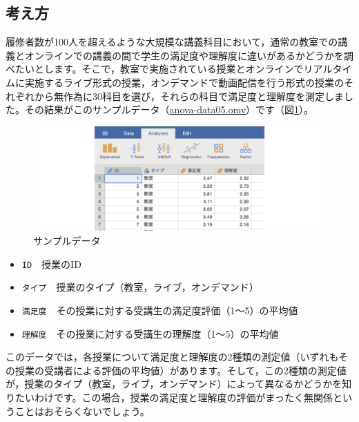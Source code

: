 \documentclass[
  12pt,
  a5jpaper,
  lualatex, ja=standard]{bxjsbook}
\providecommand{\tightlist}{%
  \setlength{\itemsep}{0pt}\setlength{\parskip}{0pt}}
\newenvironment{jmvvar}{%
	\begin{center}%
	\begin{tcolorbox}[%
		title=変数一覧,
		colframe=daidai,
		colbacktitle=daidai!30!white,
		coltitle=daidai!10!black,
		colback=daidai!2!white,
		breakable,
		width=.9\textwidth
		]\small\addtolength{\leftmargini}{-3\labelsep}%
	}%
	{\end{tcolorbox}\end{center}}
\begin{document}
\hypertarget{sub:ANOVA-mancova-basics}{%
\subsection{考え方}\label{sub:ANOVA-mancova-basics}}

履修者数が100人を超えるような大規模な講義科目において，通常の教室での講義とオンラインでの講義の間で学生の満足度や理解度に違いがあるかどうかを調べたいとします。そこで，教室で実施されている授業とオンラインでリアルタイムに実施するライブ形式の授業，オンデマンドで動画配信を行う形式の授業のそれぞれから無作為に30科目を選び，それらの科目で満足度と理解度を測定しました。その結果がこのサンプルデータ（\href{https://github.com/sbtseiji/jmv_compguide/raw/main/data/omv/anova_data05.omv}{anova-data05.omv}）です（図\ref{fig:ANOVA-data05}）。

\begin{figure}[!ht]

{\centering \includegraphics[width=1\linewidth]{images/ANOVA/data05} 

}

\caption{サンプルデータ}\label{fig:ANOVA-data05}
\end{figure}

\begin{jmvvar}

\begin{itemize}
\tightlist
\item
  \texttt{ID}　授業のID
\item
  \texttt{タイプ}　授業のタイプ（教室，ライブ，オンデマンド）
\item
  \texttt{満足度}　その授業に対する受講生の満足度評価（1〜5）の平均値
\item
  \texttt{理解度}　その授業に対する受講生の理解度（1〜5）の平均値
\end{itemize}

\end{jmvvar}

このデータでは，各授業について満足度と理解度の2種類の測定値（いずれもその授業の受講者による評価の平均値）があります。そして，この2種類の測定値が，授業のタイプ（教室，ライブ，オンデマンド）によって異なるかどうかを知りたいわけです。この場合，授業の満足度と理解度の評価がまったく無関係ということはおそらくないでしょう。
\end{document}
